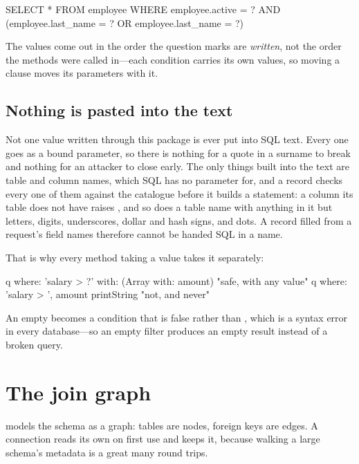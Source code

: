 \begin{plain}
SELECT * FROM employee WHERE employee.active = ?
  AND (employee.last_name = ? OR employee.last_name = ?)
\end{plain}

The values come out in the order the question marks are \emph{written}, not
the order the methods were called in---each condition carries its own values,
so moving a clause moves its parameters with it.

\subsection{Nothing is pasted into the text}

\begin{stwarn}[Injection]
Not one value written through this package is ever put into SQL text. Every
one goes as a bound parameter, so there is nothing for a quote in a surname to
break and nothing for an attacker to close early. The only things built into
the text are table and column names, which SQL has no parameter for, and a
record checks every one of them against the catalogue before it builds a
statement: a column its table does not have raises , and so
does a table name with anything in it but letters, digits, underscores,
dollar and hash signs, and dots. A record filled from a request's field names therefore
cannot be handed SQL in a name.

That is why every method taking a value takes it separately:

\begin{st}
q where: 'salary > ?' with: (Array with: amount)   "safe, with any value"
q where: 'salary > ', amount printString           "not, and never"
\end{st}
\end{stwarn}

An empty  becomes a condition that is false rather than
, which is a syntax error in every database---so an empty filter
produces an empty result instead of a broken query.

\section{The join graph}

 models the schema as a graph: tables are nodes, foreign
keys are edges. A connection reads its own on first use and keeps it, because
walking a large schema's metadata is a great many round trips.

